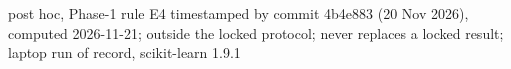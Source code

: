 post hoc, Phase-1 rule E4 timestamped by commit 4b4e883 (20 Nov 2026), computed 2026-11-21; outside the locked protocol; never replaces a locked result; laptop run of record, scikit-learn 1.9.1
